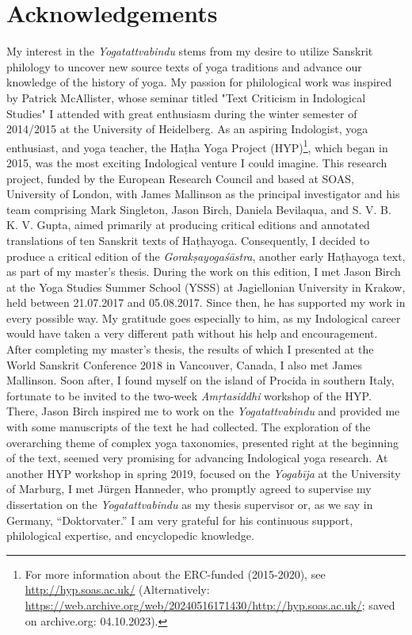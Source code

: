 \chapter*{Acknowledgements}

My interest in the \textit{Yogatattvabindu} stems from my desire to utilize Sanskrit philology to uncover new source texts of yoga traditions and advance our knowledge of the history of yoga. My passion for philological work was inspired by Patrick McAllister, whose seminar titled "Text Criticism in Indological Studies" I attended with great enthusiasm during the winter semester of 2014/2015 at the University of Heidelberg. As an aspiring Indologist, yoga enthusiast, and yoga teacher, the Haṭha Yoga Project (HYP)\footnote{For more information about the ERC-funded  (2015-2020), see \url{http://hyp.soas.ac.uk/} (Alternatively: \url{https://web.archive.org/web/20240516171430/http://hyp.soas.ac.uk/}; saved on archive.org: 04.10.2023).}, which began in 2015, was the most exciting Indological venture I could imagine. This research project, funded by the European Research Council and based at SOAS, University of London, with James Mallinson as the principal investigator and his team comprising Mark Singleton, Jason Birch, Daniela Bevilaqua, and S. V. B. K. V. Gupta, aimed primarily at producing critical editions and annotated translations of ten Sanskrit texts of Haṭhayoga. Consequently, I decided to produce a critical edition of the \emph{Gorakṣayogaśāstra}, another early Haṭhayoga text, as part of my master's thesis.
During the work on this edition, I met Jason Birch at the Yoga Studies Summer School (YSSS) at Jagiellonian University in Krakow, held between 21.07.2017 and 05.08.2017. Since then, he has supported my work in every possible way. My gratitude goes especially to him, as my Indological career would have taken a very different path without his help and encouragement. After completing my master's thesis, the results of which I presented at the World Sanskrit Conference 2018 in Vancouver, Canada, I also met James Mallinson. Soon after, I found myself on the island of Procida in southern Italy, fortunate to be invited to the two-week \emph{Amṛtasiddhi} workshop of the HYP. There, Jason Birch inspired me to work on the \emph{Yogatattvabindu} and provided me with some manuscripts of the text he had collected. The exploration of the overarching theme of complex yoga taxonomies, presented right at the beginning of the text, seemed very promising for advancing Indological yoga research. At another HYP workshop in spring 2019, focused on the \emph{Yogabīja} at the University of Marburg, I met Jürgen Hanneder, who promptly agreed to supervise my dissertation on the \emph{Yogatattvabindu} as my thesis supervisor or, as we say in Germany, “Doktorvater.” I am very grateful for his continuous support, philological expertise, and encyclopedic knowledge.
